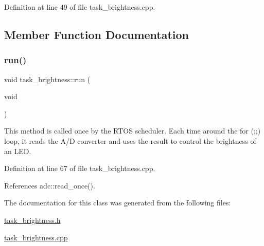 Definition at line 49 of file task\+\_\+brightness.\+cpp.



\subsection{Member Function Documentation}
\mbox{\label{classtask__brightness_a615beac07a99f0856f048a46fd9a3898}} 
\subsubsection{\texorpdfstring{run()}{run()}}
{\footnotesize\ttfamily void task\+\_\+brightness\+::run (\begin{DoxyParamCaption}\item[{void}]{ }\end{DoxyParamCaption})}

This method is called once by the R\+T\+OS scheduler. Each time around the for (;;) loop, it reads the A/D converter and uses the result to control the brightness of an L\+ED. 

Definition at line 67 of file task\+\_\+brightness.\+cpp.



References adc\+::read\+\_\+once().



The documentation for this class was generated from the following files\+:\begin{DoxyCompactItemize}
\item 
\mbox{\hyperlink{task__brightness_8h}{task\+\_\+brightness.\+h}}\item 
\mbox{\hyperlink{task__brightness_8cpp}{task\+\_\+brightness.\+cpp}}\end{DoxyCompactItemize}
